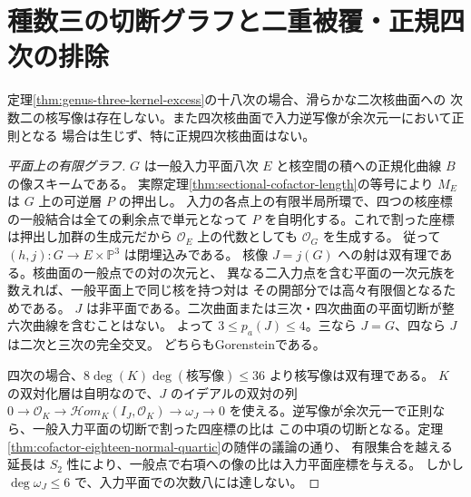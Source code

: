 \section{種数三の切断グラフと二重被覆・正規四次の排除}
\label{sec:sectional-eighteen-kernel-graph}
\begin{theorem}\label{thm:sectional-eighteen-kernel-graph}
定理\ref{thm:genus-three-kernel-excess}の十八次の場合、滑らかな二次核曲面への
次数二の核写像は存在しない。また四次核曲面で入力逆写像が余次元一において正則となる
場合は生じず、特に正規四次核曲面はない。
\end{theorem}
\begin{proof}[平面上の有限グラフ]
$G$ は一般入力平面八次 $E$ と核空間の積への正規化曲線 $B$ の像スキームである。
実際定理\ref{thm:sectional-cofactor-length}の等号により $M_E$ は $G$ 上の可逆層 $P$ の押出し。
入力の各点上の有限半局所環で、四つの核座標の一般結合は全ての剰余点で単元となって
$P$ を自明化する。これで割った座標は押出し加群の生成元だから
$\mathcal O_E$ 上の代数としても $\mathcal O_G$ を生成する。
従って $(h,j):G\to E\times\mathbb P^3$ は閉埋込みである。
核像 $J=j(G)$ への射は双有理である。核曲面の一般点での対の次元と、
異なる二入力点を含む平面の一次元族を数えれば、一般平面上で同じ核を持つ対は
その開部分では高々有限個となるためである。
$J$ は非平面である。二次曲面または三次・四次曲面の平面切断が整六次曲線を含むことはない。
よって $3\le p_a(J)\le4$。三なら $J=G$、四なら $J$ は二次と三次の完全交叉。
どちらもGorensteinである。

四次の場合、$8\deg(K)\deg(\text{核写像})\le36$ より核写像は双有理である。
$K$ の双対化層は自明なので、$J$ のイデアルの双対の列
$0\to\mathcal O_K\to\mathcal Hom_K(I_J,\mathcal O_K)\to\omega_J\to0$
を使える。逆写像が余次元一で正則なら、一般入力平面の切断で割った四座標の比は
この中項の切断となる。定理\ref{thm:cofactor-eighteen-normal-quartic}の随伴の議論の通り、
有限集合を越える延長は $S_2$ 性により、一般点で右項への像の比は入力平面座標を与える。
しかし $\deg\omega_J\le6$ で、入力平面での次数八には達しない。
\end{proof}

